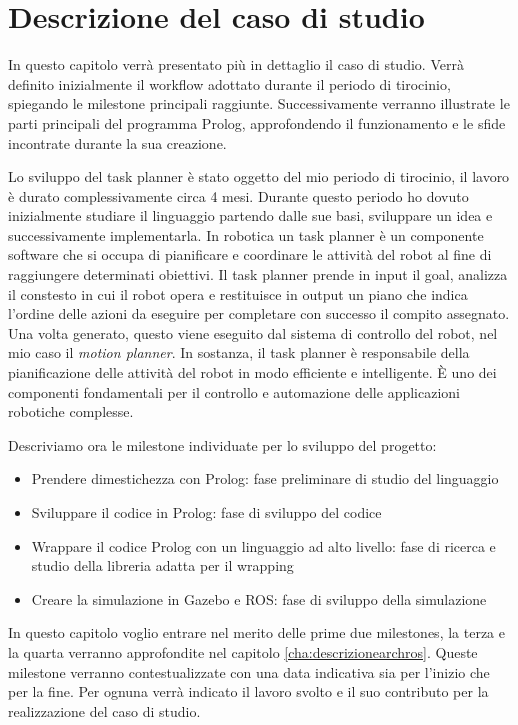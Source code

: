 \clearpage
\newpage
\chapter{Descrizione del caso di studio}
\label{cha:descrizionecasostudio}
In questo capitolo verrà presentato più in dettaglio il caso di studio. Verrà definito inizialmente il workflow adottato durante il periodo di tirocinio, spiegando le milestone principali raggiunte.
Successivamente verranno illustrate le parti principali del programma Prolog, approfondendo il funzionamento e le sfide incontrate durante la sua creazione.

Lo sviluppo del task planner è stato oggetto del mio periodo di tirocinio, il lavoro è durato complessivamente circa 4 mesi. Durante questo periodo ho dovuto inizialmente studiare il linguaggio partendo dalle sue basi, sviluppare un idea e successivamente implementarla.
In robotica un task planner è un componente software che si occupa di pianificare e coordinare le attività del robot al fine di raggiungere determinati obiettivi.
Il task planner prende in input il goal, analizza il constesto in cui il robot opera e restituisce in output un piano che indica l'ordine delle azioni da eseguire per completare con successo il compito assegnato.
Una volta generato, questo viene eseguito dal sistema di controllo del robot, nel mio caso il \textit{motion planner}. In sostanza, il task planner è responsabile della pianificazione delle attività del robot in modo efficiente e intelligente. È uno dei componenti fondamentali per il controllo e automazione delle applicazioni robotiche complesse.

Descriviamo ora le milestone individuate per lo sviluppo del progetto:
\begin{itemize}
    \item Prendere dimestichezza con Prolog: fase preliminare di studio del linguaggio
    \item Sviluppare il codice in Prolog: fase di sviluppo del codice
    \item Wrappare il codice Prolog con un linguaggio ad alto livello: fase di ricerca e studio della libreria adatta per il wrapping
    \item Creare la simulazione in Gazebo e ROS: fase di sviluppo della simulazione
\end{itemize}
In questo capitolo voglio entrare nel merito delle prime due milestones, la terza e la quarta verranno approfondite nel capitolo \ref{cha:descrizionearchros}.
Queste milestone verranno contestualizzate con una data indicativa sia per l'inizio che per la fine. Per ognuna verrà indicato il lavoro svolto e il suo contributo per la realizzazione del caso di studio.

